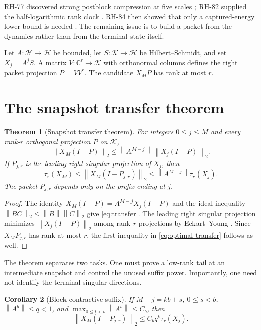 \documentclass[11pt]{article}
\newtheorem{theorem}{Theorem}[section]
\newtheorem{corollary}[theorem]{Corollary}
\theoremstyle{remark}
\newcommand{\norm}[1]{\left\lVert#1\right\rVert}
\begin{document}
RH-77 discovered strong postblock compression at five scales
\citep{WangRankCompression2026}; RH-82 supplied the half-logarithmic rank
clock \citep{WangHalfLog2026}.  RH-84 then showed that only a captured-energy
lower bound is needed \citep{WangKyFan2026}.  The remaining issue is to build
a packet from the dynamics rather than from the terminal state itself.

Let $A:\mathcal H\to\mathcal H$ be bounded, let
$S:\mathcal K\to\mathcal H$ be Hilbert--Schmidt, and set
$X_j=A^jS$.  A matrix $V:\mathbb C^r\to\mathcal K$ with orthonormal columns
defines the right packet projection $P=VV^*$.  The candidate $X_MP$ has rank
at most $r$.

\section{The snapshot transfer theorem}

\begin{theorem}[Snapshot transfer theorem]
\label{thm:transfer}
For integers $0\le j\le M$ and every rank-$r$ orthogonal projection $P$ on
$\mathcal K$,
\begin{equation}
 \boxed{\norm{X_M(I-P)}_2
 \le \norm{A^{M-j}}\,\norm{X_j(I-P)}_2.}
 \label{eq:transfer}
\end{equation}
If $P_{j,r}$ is the leading right singular projection of $X_j$, then
\begin{equation}
 \tau_r(X_M)
 \le \norm{X_M(I-P_{j,r})}_2
 \le \norm{A^{M-j}}\tau_r(X_j).
 \label{eq:optimal-transfer}
\end{equation}
The packet $P_{j,r}$ depends only on the prefix ending at $j$.
\end{theorem}

\begin{proof}
The identity
$X_M(I-P)=A^{M-j}X_j(I-P)$ and the ideal inequality
$\norm{BC}_2\le\norm{B}\norm{C}_2$ give \eqref{eq:transfer}.
The leading right singular projection minimizes
$\norm{X_j(I-P)}_2$ among rank-$r$ projections by Eckart--Young
\citep{Bhatia1997}.  Since $X_MP_{j,r}$ has rank at most $r$, the first
inequality in \eqref{eq:optimal-transfer} follows as well.
\end{proof}

The theorem separates two tasks.  One must prove a low-rank tail at an
intermediate snapshot and control the unused suffix power.  Importantly, one
need not identify the terminal singular directions.

\begin{corollary}[Block-contractive suffix]
If $M-j=kb+s$, $0\le s<b$, $\norm{A^b}\le q<1$, and
$\max_{0\le t<b}\norm{A^t}\le C_b$, then
\[
 \norm{X_M(I-P_{j,r})}_2\le C_bq^k\tau_r(X_j).
\]
\end{corollary}
\end{document}
